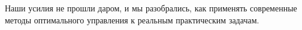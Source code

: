Наши усилия не прошли даром, и мы разобрались, как применять современные методы оптимального управления к реальным практическим задачам.